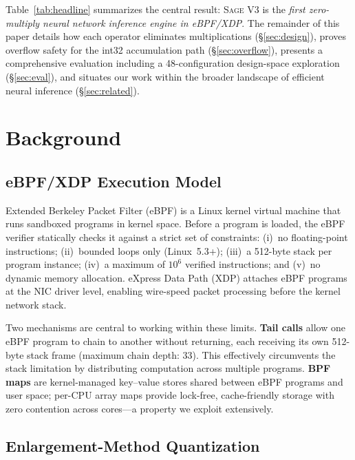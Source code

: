 \documentclass[sigconf,nonacm]{acmart}
\newcommand{\sys}{\textsc{Sage}\xspace}
\begin{document}
Table~\ref{tab:headline} summarizes the central result: \sys V3 is the
\emph{first zero-multiply neural network inference engine in eBPF/XDP}.
The remainder of this paper details how each operator eliminates
multiplications (\S\ref{sec:design}), proves overflow safety for the
int32 accumulation path (\S\ref{sec:overflow}), presents a comprehensive
evaluation including a 48-configuration design-space exploration
(\S\ref{sec:eval}), and situates our work within the broader landscape
of efficient neural inference (\S\ref{sec:related}).


\section{Background}\label{sec:background}

\subsection{eBPF/XDP Execution Model}

Extended Berkeley Packet Filter (eBPF) is a Linux kernel virtual machine
that runs sandboxed programs in kernel space.
Before a program is loaded, the eBPF verifier statically checks it
against a strict set of constraints:
(i)~no floating-point instructions;
(ii)~bounded loops only (Linux~5.3+);
(iii)~a 512-byte stack per program instance;
(iv)~a maximum of $10^6$ verified instructions; and
(v)~no dynamic memory allocation.
eXpress Data Path (XDP) attaches eBPF programs at the NIC driver level,
enabling wire-speed packet processing before the kernel network stack.

Two mechanisms are central to working within these limits.
\textbf{Tail calls} allow one eBPF program to chain to another without
returning, each receiving its own 512-byte stack frame (maximum chain
depth: 33).
This effectively circumvents the stack limitation by distributing
computation across multiple programs.
\textbf{BPF maps} are kernel-managed key--value stores shared between
eBPF programs and user space; per-CPU array maps provide lock-free,
cache-friendly storage with zero contention across cores---a property
we exploit extensively.

\subsection{Enlargement-Method Quantization}\label{sec:enlarge}
\end{document}
